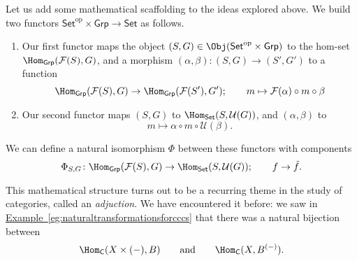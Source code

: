 \documentclass[notes.tex]{subfiles}
\begin{document}
Let us add some mathematical scaffolding to the ideas explored above. We build two functors $\mathsf{Set}^{\mathrm{op}} \times \mathsf{Grp} \rightarrow \mathsf{Set}$ as follows.
\begin{enumerate}
  \item Our first functor maps the object $(S, G) \in \Obj(\mathsf{Set}^{\mathrm{op}} \times \mathsf{Grp})$ to the hom-set $\Hom_{\mathsf{Grp}}(\mathcal{F}(S), G)$, and a morphism $(\alpha, \beta)\colon (S,G) \to (S', G')$ to a function
    \begin{equation*}
      \Hom_{\mathsf{Grp}}(\mathcal{F}(S), G) \to \Hom_{\mathsf{Grp}}(\mathcal{F}(S'), G');\qquad m \mapsto \mathcal{F}(\alpha) \circ m \circ \beta
    \end{equation*}

  \item Our second functor maps $(S, G)$ to $\Hom_{\mathsf{Set}}(S, \mathcal{U}(G))$, and $(\alpha, \beta)$ to
    \begin{equation*}
      m \mapsto \alpha \circ m \circ \mathcal{U}(\beta).
    \end{equation*}
\end{enumerate}
We can define a natural isomorphism $\Phi$ between these functors with components
\begin{equation*}
  \Phi_{S, G}\colon \Hom_{\mathsf{Grp}}(\mathcal{F}(S), G) \to \Hom_{\mathsf{Set}}(S, \mathcal{U}(G));\qquad f \to \tilde{f}.
\end{equation*}

This mathematical structure turns out to be a recurring theme in the study of categories, called an \emph{adjuction}. We have encountered it before: we saw in \hyperref[eg:naturaltransformationsforcccs]{Example~\ref*{eg:naturaltransformationsforcccs}} that there was a natural bijection between
\begin{equation*}
  \Hom_{\mathsf{C}}(X \times (-), B)\qquad\text{and}\qquad \Hom_{\mathsf{C}}(X, B^{(-)}).
\end{equation*}
\end{document}
